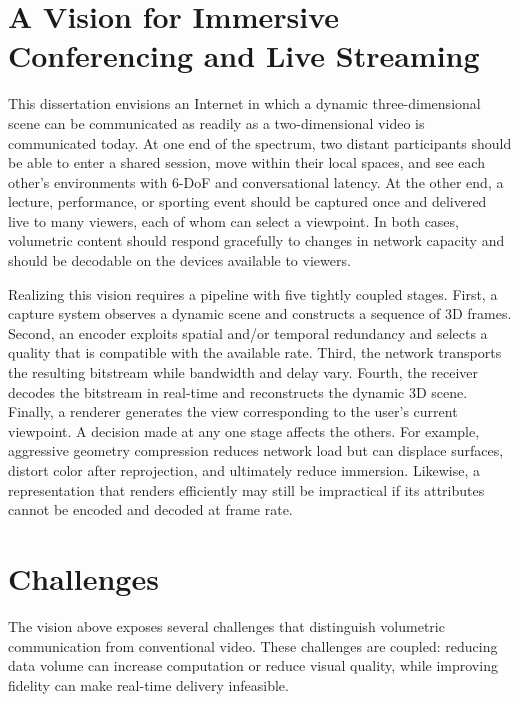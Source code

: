 \section{A Vision for Immersive Conferencing and Live Streaming}
\label{sec:intro_v2_vision}
%
This dissertation envisions an Internet in which a dynamic three-dimensional scene can be communicated as readily as a two-dimensional video is communicated today.
%
At one end of the spectrum, two distant participants should be able to enter a shared session, move within their local spaces, and see each other's environments with 6-DoF and conversational latency.
%
At the other end, a lecture, performance, or sporting event should be captured once and delivered live to many viewers, each of whom can select a viewpoint.
%
In both cases, volumetric content should respond gracefully to changes in network capacity and should be decodable on the devices available to viewers.

Realizing this vision requires a pipeline with five tightly coupled stages.
%
First, a capture system observes a dynamic scene and constructs a sequence of 3D frames.
%
Second, an encoder exploits spatial and/or temporal redundancy and selects a quality that is compatible with the available rate.
%
Third, the network transports the resulting bitstream while bandwidth and delay vary.
%
Fourth, the receiver decodes the bitstream in real-time and reconstructs the dynamic 3D scene.
%
Finally, a renderer generates the view corresponding to the user's current viewpoint.
%
A decision made at any one stage affects the others.
%
For example, aggressive geometry compression reduces network load but can displace surfaces, distort color after reprojection, and ultimately reduce immersion.
%
Likewise, a representation that renders efficiently may still be impractical if its attributes cannot be encoded and decoded at frame rate.

\section{Challenges}
\label{sec:intro_v2_challenges}

The vision above exposes several challenges that distinguish volumetric communication from conventional video.
%
These challenges are coupled: reducing data volume can increase computation or reduce visual quality, while improving fidelity can make real-time delivery infeasible. 

